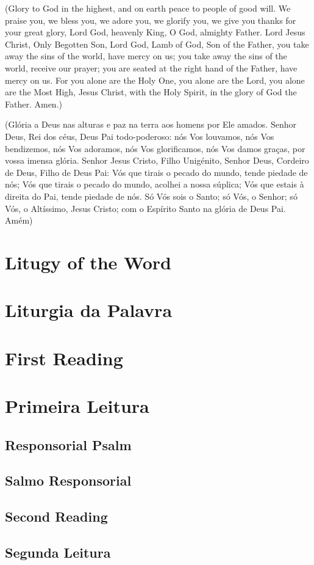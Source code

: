\documentclass[10pt,a5]{article}
\newcommand \sect[2] {\section*{#1} \switchcolumn \section*{#2} \switchcolumn*}
\newcommand \subsect[2] {\subsection*{#1} \switchcolumn \subsection*{#2} \switchcolumn*}
\begin{document}
\begin{paracol}{2}

(Glory to God in the highest,
and on earth peace to people
of good will.
We praise you, we bless you,
we adore you, we glorify you,
we give you thanks for your great
glory,
Lord God, heavenly King, O God,
almighty Father.
Lord Jesus Christ, Only Begotten Son,
Lord God, Lamb of God, Son of the
Father,
you take away the sins of the world,
have mercy on us;
you take away the sins of the world,
receive our prayer;
you are seated at the right hand
of the Father, have mercy on us.
For you alone are the Holy One,
you alone are the Lord,
you alone are the Most High,
Jesus Christ, with the Holy Spirit,
in the glory of God the Father. Amen.)

\switchcolumn

(Gl\'oria a Deus nas alturas e paz na terra aos homens por Ele amados.
 Senhor Deus, Rei dos c\'eus, Deus Pai todo-poderoso:
 n\'os Vos louvamos, n\'os Vos bendizemos, n\'os Vos adoramos, n\'os Vos glorificamos,
 n\'os Vos damos graças, por vossa imensa gl\'oria.
 Senhor Jesus Cristo, Filho Unig\'enito, Senhor Deus, Cordeiro de Deus, Filho de Deus Pai:
 V\'os que tirais o pecado do mundo, tende piedade de n\'os;
 V\'os que tirais o pecado do mundo, acolhei a nossa s\'uplica;
 V\'os que estais \`a direita do Pai, tende piedade de n\'os.
 S\'o V\'os sois o Santo;
 s\'o V\'os, o Senhor;
 s\'o V\'os, o Alt\'issimo, Jesus Cristo;
 com o Esp\'irito Santo na gl\'oria de Deus Pai.
 Am\'em)

 \switchcolumn*

 \sect{Litugy of the Word}{Liturgia da Palavra}

 \sect{First Reading}{Primeira Leitura}



 \switchcolumn



 \switchcolumn*

 \subsect{Responsorial Psalm}{Salmo Responsorial}


 \switchcolumn


 \switchcolumn*

 \subsect{Second Reading}{Segunda Leitura}



\end{paracol}
\end{document}
